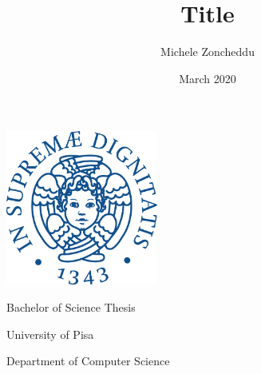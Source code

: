 \documentclass{article}
\title{Title}
\author{Michele Zoncheddu}
\date{March 2020}
\begin{document}
\begin{titlepage}
	\centering
	\includegraphics[height=12pc]{img/cherubino_unipi.pdf}
	\bigskip
	\bigskip
	\bigskip

	{\LARGE{\textbf{\@title}}}
	\bigskip
	\bigskip
	\medskip

	{\large{Bachelor of Science Thesis}}
	\bigskip
	\bigskip
	\medskip

	{\Large{\textbf{\@author}}}
	\bigskip
	\bigskip
	\medskip

	{\Large{University of Pisa}}
	\bigskip

	{\Large{Department of Computer Science}}
	\bigskip

	{\Large{\@date}}
\end{titlepage}

\tableofcontents
{}
\pagebreak

	
	\newpage
	
	\newpage
	
	\newpage
	
	\newpage
	
	
\end{document}
